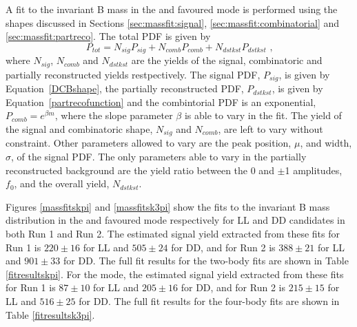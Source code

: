 A fit to the invariant B mass in the \kpi and \kpipipi favoured mode is performed using the shapes discussed in Sections \ref{sec:massfit:signal}, \ref{sec:massfit:combinatorial} and \ref{sec:massfit:partreco}. The total PDF is given by
\begin{equation}
P_{tot} = N_{sig}P_{sig} + N_{comb}P_{comb} + N_{dstkst}P_{dstkst} \text{ ,}
\end{equation}
where $N_{sig}$, $N_{comb}$ and $N_{dstkst}$ are the yields of the signal, combinatoric and partially reconstructed yields restpectively. The signal PDF, $P_{sig}$, is given by Equation~\ref{DCBshape}, the partially reconstructed PDF, $P_{dstkst}$, is given by Equation~\ref{partrecofunction} and the combintorial PDF is an exponential, $P_{comb} = e^{\beta m}$, where the slope parameter $\beta$ is able to vary in the fit. The yield of the signal and combinatoric shape, $N_{sig}$ and $N_{comb}$, are left to vary without constraint. Other parameters allowed to vary are the peak position, $\mu$, and width, $\sigma$, of the signal PDF. The only parameters able to vary in the partially reconstructed background are the yield ratio between the 0 and $\pm$1 amplitudes, $f_0$, and the overall yield, $N_{dstkst}$.

Figures \ref{massfitskpi} and \ref{massfitsk3pi} show the fits to the invariant B mass distribution in the \kpi and \kpipipi favoured mode respectively for LL and DD candidates in both Run 1 and Run 2. The estimated \kpi signal yield extracted from these fits for Run 1 is $220 \pm 16$ for LL and $505 \pm 24$ for DD, and for Run 2 is $388 \pm 21$ for LL and $901 \pm 33$ for DD. The full fit results for the two-body \kpi fits are shown in Table \ref{fitresultskpi}. For the \kpipipi mode, the estimated signal yield extracted from these fits for Run 1 is $87 \pm 10$ for LL and $205 \pm 16$ for DD, and for Run 2 is $215 \pm 15$ for LL and $516 \pm 25$ for DD. The full fit results for the four-body \kpipipi fits are shown in Table \ref{fitresultsk3pi}.

